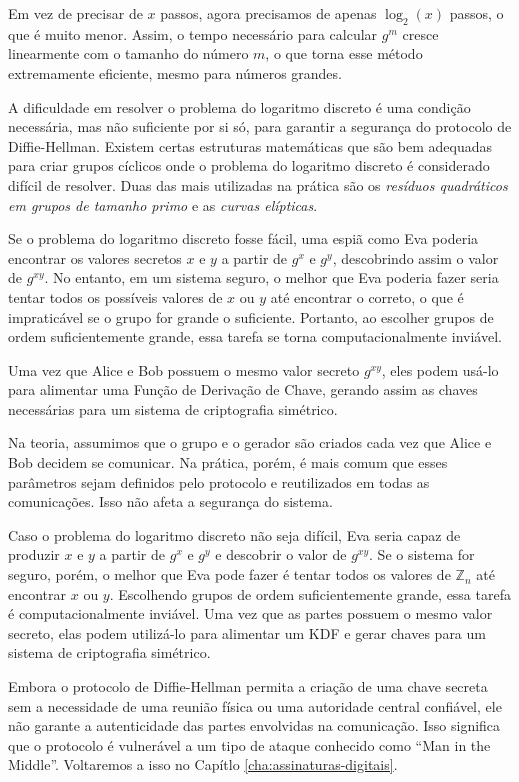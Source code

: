 Em vez de precisar de $x$ passos, agora precisamos de apenas $\log_2(x)$ passos, o que é muito menor.
Assim, o tempo necessário para calcular $g^m$ cresce linearmente com o tamanho do número $m$, o que torna esse método extremamente eficiente, mesmo para números grandes.

A dificuldade em resolver o problema do logaritmo discreto é uma condição necessária, mas não suficiente por si só, para garantir a segurança do protocolo de Diffie-Hellman.
Existem certas estruturas matemáticas que são bem adequadas para criar grupos cíclicos onde o problema do logaritmo discreto é considerado difícil de resolver.
Duas das mais utilizadas na prática são os {\em resíduos quadráticos em grupos de tamanho primo} e as {\em curvas elípticas}.

Se o problema do logaritmo discreto fosse fácil, uma espiã como Eva poderia encontrar os valores secretos $x$ e $y$ a partir de $g^x$ e $g^y$, descobrindo assim o valor de $g^{xy}$.
No entanto, em um sistema seguro, o melhor que Eva poderia fazer seria tentar todos os possíveis valores de $x$ ou $y$ até encontrar o correto, o que é impraticável se o grupo for grande o suficiente.
Portanto, ao escolher grupos de ordem suficientemente grande, essa tarefa se torna computacionalmente inviável.

Uma vez que Alice e Bob possuem o mesmo valor secreto $g^{xy}$, eles podem usá-lo para alimentar uma Função de Derivação de Chave, gerando assim as chaves necessárias para um sistema de criptografia simétrico.

Na teoria, assumimos que o grupo e o gerador são criados cada vez que Alice e Bob decidem se comunicar.
Na prática, porém, é mais comum que esses parâmetros sejam definidos pelo protocolo e reutilizados em todas as comunicações.
Isso não afeta a segurança do sistema.

Caso o problema do logaritmo discreto não seja difícil, Eva seria capaz de produzir $x$ e $y$ a partir de $g^x$ e $g^y$ e descobrir o valor de $g^{xy}$.
Se o sistema for seguro, porém, o melhor que Eva pode fazer é tentar todos os valores de $\mathbb{Z}_n$ até encontrar $x$ ou $y$.
Escolhendo grupos de ordem suficientemente grande, essa tarefa é computacionalmente inviável.
Uma vez que as partes possuem o mesmo valor secreto, elas podem utilizá-lo para alimentar um KDF e gerar chaves para um sistema de criptografia simétrico.

Embora o protocolo de Diffie-Hellman permita a criação de uma chave secreta sem a necessidade de uma reunião física ou uma autoridade central confiável, ele não garante a autenticidade das partes envolvidas na comunicação.
Isso significa que o protocolo é vulnerável a um tipo de ataque conhecido como ``Man in the Middle''.
Voltaremos a isso no Capítlo \ref{cha:assinaturas-digitais}.

